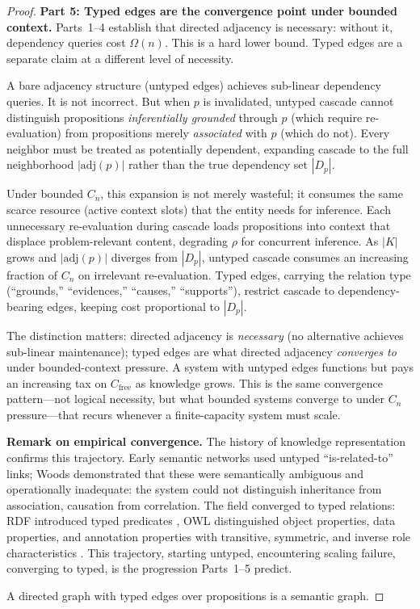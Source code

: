 \documentclass[11pt]{article}
\theoremstyle{definition}
\begin{document}
\begin{proof}
\textbf{Part 5: Typed edges are the convergence point under bounded
context.}
Parts~1--4 establish that directed adjacency is necessary: without it,
dependency queries cost $\Omega(n)$. This is a hard lower bound. Typed
edges are a separate claim at a different level of necessity.

A bare adjacency structure (untyped edges) achieves sub-linear
dependency queries. It is not incorrect. But when $p$ is invalidated,
untyped cascade cannot distinguish propositions \emph{inferentially
grounded} through $p$ (which require re-evaluation) from propositions
merely \emph{associated} with $p$ (which do not). Every neighbor must
be treated as potentially dependent, expanding cascade to the full
neighborhood $|\mathrm{adj}(p)|$ rather than the true dependency set
$|D_p|$.

Under bounded $C_n$, this expansion is not merely wasteful; it
consumes the same scarce resource (active context slots) that the
entity needs for inference. Each unnecessary re-evaluation during
cascade loads propositions into context that displace
problem-relevant content, degrading $\rho$ for concurrent inference.
As $|K|$ grows and $|\mathrm{adj}(p)|$ diverges from $|D_p|$, untyped
cascade consumes an increasing fraction of $C_n$ on irrelevant
re-evaluation. Typed edges, carrying the relation type (``grounds,''
``evidences,'' ``causes,'' ``supports''), restrict cascade to
dependency-bearing edges, keeping cost proportional to $|D_p|$.

The distinction matters: directed adjacency is \emph{necessary} (no
alternative achieves sub-linear maintenance); typed edges are what
directed adjacency \emph{converges to} under bounded-context
pressure. A system with untyped edges functions but pays an
increasing tax on $C_{\mathrm{free}}$ as knowledge grows. This is
the same convergence pattern---not logical necessity, but what
bounded systems converge to under $C_n$ pressure---that recurs
whenever a finite-capacity system must scale.

\textbf{Remark on empirical convergence.}
The history of knowledge representation confirms this trajectory.
Early semantic networks used untyped ``is-related-to'' links;
Woods \cite{Woods1975} demonstrated that these were semantically
ambiguous and operationally inadequate: the system could not
distinguish inheritance from association, causation from correlation.
The field converged to typed relations: RDF introduced typed
predicates \cite{BernersLee2001}, OWL distinguished object properties,
data properties, and annotation properties with transitive, symmetric,
and inverse role characteristics \cite{BaaderCalvaneseEtAl2003}.
This trajectory, starting untyped, encountering scaling failure,
converging to typed, is the progression Parts~1--5 predict.

A directed graph with typed edges over propositions is a semantic graph.
\end{proof}
\end{document}
